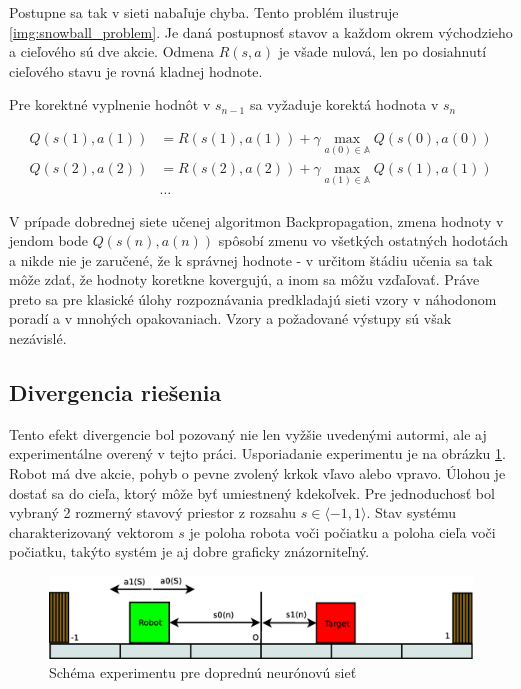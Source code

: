 Postupne sa tak v sieti nabaľuje chyba. Tento problém ilustruje \ref{img:snowball_problem}.
Je daná postupnosť stavov a každom okrem východzieho a cieľového sú dve akcie.
Odmena $R(s,a)$ je všade nulová, len po dosiahnutí cieľového stavu je rovná kladnej hodnote.

Pre korektné vyplnenie hodnôt v $s_{n-1}$ sa vyžaduje korektá hodnota v $s_{n}$

\begin{align*}
    Q(s(1),a(1)) &= R(s(1),a(1)) + \gamma \max_{a(0) \in \mathbb{A}} Q(s(0), a(0)) \\
    Q(s(2),a(2)) &= R(s(2),a(2)) + \gamma \max_{a(1) \in \mathbb{A}} Q(s(1), a(1)) \\
    & \dots
\end{align*}

V prípade dobrednej siete učenej algoritmon Backpropagation, zmena hodnoty v jendom bode $Q(s(n),a(n))$ spôsobí
zmenu vo všetkých ostatných hodotách a nikde nie je zaručené, že k správnej hodnote -
v určitom štádiu učenia sa tak môže zdať, že hodnoty koretkne kovergujú, a inom
sa môžu vzďaľovať. Práve preto sa pre klasické úlohy rozpoznávania predkladajú sieti vzory
v náhodonom poradí a v mnohých opakovaniach. Vzory a požadované výstupy sú však nezávislé.

\subsection{Divergencia riešenia}

Tento efekt divergencie bol pozovaný nie len vyžšie uvedenými autormi, ale aj experimentálne
overený v tejto práci. Usporiadanie experimentu je na obrázku \ref{img:1D_experiment_schem}.
Robot má dve akcie, pohyb o pevne zvolený krkok vľavo alebo vpravo. Úlohou je dostať sa
do cieľa, ktorý môže byť umiestnený kdekoľvek. Pre jednoduchosť bol vybraný 2 rozmerný stavový priestor
z rozsahu $s \in \langle -1, 1 \rangle$. Stav systému charakterizovaný vektorom $s$ je
poloha robota voči počiatku a poloha cieľa voči počiatku, takýto systém je aj dobre graficky znázorniteľný.

\begin{figure}[!htb]
\center
\includegraphics[scale=.3]{../diagrams/1D_robot_diagram.eps}
\caption{Schéma experimentu pre doprednú neurónovú sieť}
\label{img:1D_experiment_schem}
\end{figure}

